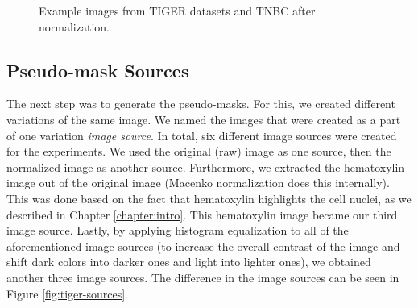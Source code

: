 \begin{figure}[H]
  \caption{Example images from TIGER datasets \cite{tiger_dataset} and TNBC \cite{TNBC-nuclei-seg-extended} after normalization.}
  \label{fig:mix-norm}
\end{figure}


\subsection{Pseudo-mask Sources} 
\label{subs:mask-sources}
The next step was to generate the pseudo-masks. For this, we created different variations of the same image. We named the images that were created as a part of one variation \textit{image source}. In total, six different image sources were created for the experiments. We used the original (raw) image as one source, then the normalized image as another source. Furthermore, we extracted the hematoxylin image out of the original image (Macenko normalization does this internally). This was done based on the fact that hematoxylin highlights the cell nuclei, as we described in Chapter \ref{chapter:intro}. This hematoxylin image became our third image source. Lastly, by applying histogram equalization to all of the aforementioned image sources (to increase the overall contrast of the image and shift dark colors into darker ones and light into lighter ones), we obtained another three image sources. The difference in the image sources can be seen in Figure \ref{fig:tiger-sources}. 

